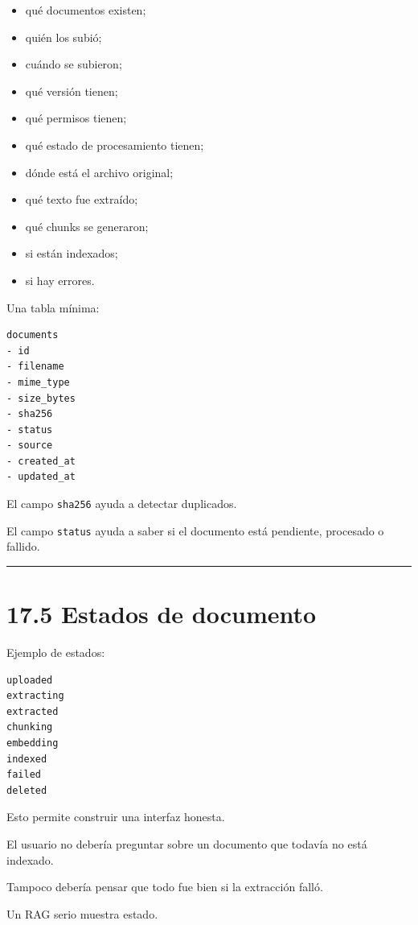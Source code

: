 \begin{itemize}
\tightlist
\item
  qué documentos existen;
\item
  quién los subió;
\item
  cuándo se subieron;
\item
  qué versión tienen;
\item
  qué permisos tienen;
\item
  qué estado de procesamiento tienen;
\item
  dónde está el archivo original;
\item
  qué texto fue extraído;
\item
  qué chunks se generaron;
\item
  si están indexados;
\item
  si hay errores.
\end{itemize}

Una tabla mínima:

\begin{lstlisting}
documents
- id
- filename
- mime_type
- size_bytes
- sha256
- status
- source
- created_at
- updated_at
\end{lstlisting}

El campo \passthrough{\lstinline!sha256!} ayuda a detectar duplicados.

El campo \passthrough{\lstinline!status!} ayuda a saber si el documento
está pendiente, procesado o fallido.

\begin{center}\rule{0.5\linewidth}{0.5pt}\end{center}

\section{17.5 Estados de documento}\label{estados-de-documento}

Ejemplo de estados:

\begin{lstlisting}
uploaded
extracting
extracted
chunking
embedding
indexed
failed
deleted
\end{lstlisting}

Esto permite construir una interfaz honesta.

El usuario no debería preguntar sobre un documento que todavía no está
indexado.

Tampoco debería pensar que todo fue bien si la extracción falló.

Un RAG serio muestra estado.

